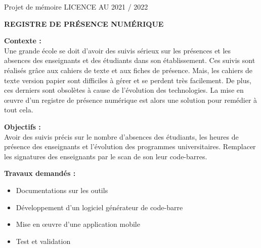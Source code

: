 \begin{titlepage}
	


	\begin{center}
		Projet de mémoire LICENCE  AU 2021 / 2022
	\end{center}

	\begin{center}
		\large{\textbf{REGISTRE DE PRÉSENCE NUMÉRIQUE}} \\
	\end{center}

	\begin{normalsize}
		\noindent\textbf{Contexte :} \\
		\indent Une grande école se doit d'avoir des suivis sérieux sur les présences et les absences des enseignants et des étudiants dans son établissement. Ces suivis sont réalisés grâce aux cahiers de texte et aux fiches de présence. Mais, les cahiers de texte version papier sont difficiles à gérer et se perdent très facilement. De plus, ces derniers sont obsolètes à cause de l’évolution des technologies. La mise en œuvre d’un registre de présence numérique est alors une solution pour remédier à tout cela. \\
	\end{normalsize}

	\begin{normalsize}
		\noindent\textbf{Objectifs :} \\
		\indent Avoir des suivis précis sur le nombre d’absences des étudiants, les heures de présence des enseignants et l’évolution des programmes universitaires. Remplacer les signatures des enseignants par le scan de son leur code-barres.
\\
	\end{normalsize}

	\begin{normalsize}
		\noindent\textbf{Travaux demandés :} 
		
		\begin{itemize}
			\item Documentations sur les outils
\vspace{3mm}
			\item Développement d’un logiciel générateur de code-barre 
\vspace{3mm}
			\item Mise en œuvre d’une application mobile
\vspace{3mm}
			\item Test et validation
\vspace{3mm}
			

\end{itemize}
\end{normalsize}
\end{titlepage}
